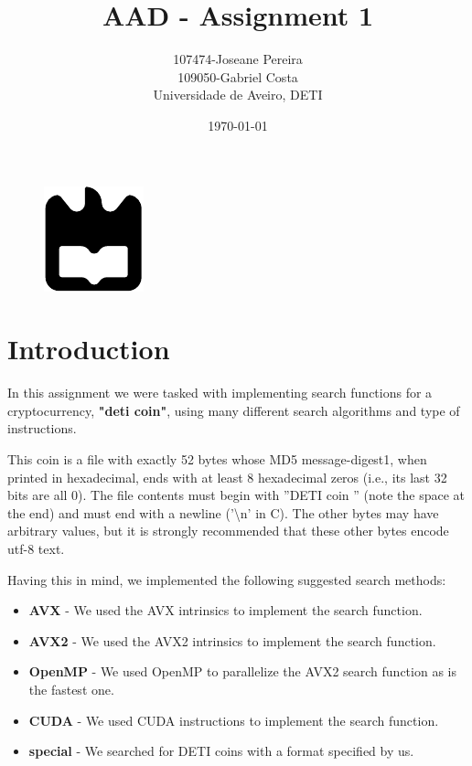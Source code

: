 \documentclass[a4paper,12pt]{article}
\title{AAD - Assignment 1}
\author{107474-Joseane Pereira \\
109050-Gabriel Costa \\
Universidade de Aveiro, DETI}
\date{\today}
\begin{document}
\begin{figure}
    \centering
    \includegraphics[width=0.3\linewidth]{ua.pdf}
    \label{fig:enter-label}
\end{figure}
\maketitle
\newpage
\tableofcontents
\newpage

\section{Introduction}
\label{sec:introduction}

In this assignment we were tasked with implementing search functions for a cryptocurrency,
\textbf{"deti coin"}, using many different search algorithms and type of instructions.

This coin is  a file with exactly 52 bytes whose MD5 message-digest1, when printed in hexadecimal,
ends with at least 8 hexadecimal zeros (i.e., its last 32 bits are all 0). The file contents must begin with
”DETI coin ” (note the space at the end) and must end with a newline (’\textbackslash n’ in C). The other bytes may
have arbitrary values, but it is strongly recommended that these other bytes encode utf-8 text. 

Having this in mind, we implemented the following suggested search methods:
\begin{itemize}
    \item \textbf{AVX} - We used the AVX intrinsics to implement the search function.
    \item \textbf{AVX2} - We used the AVX2 intrinsics to implement the search function.
    \item \textbf{OpenMP} - We used OpenMP to parallelize the AVX2 search function as is the fastest one.
    \item \textbf{CUDA} - We used CUDA instructions to implement the search function.
    \item \textbf{special} - We searched for DETI coins with a format specified by us.
\end{itemize}
\end{document}
